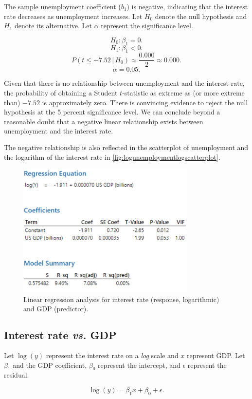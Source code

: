 \documentclass[12pt]{article}
\begin{document}
The sample unemployment coefficient ($b_1$) is negative, indicating that the interest rate decreases as unemployment increases. Let $H_0$ denote the null hypothesis and $H_1$ denote its alternative. Let $\alpha$ represent the significance level.

\[H_0:\beta_1=0.\]
\[H_1:\beta_1<0.\]
\[P(t\leq -7.52\,|\,H_0)\approx\frac{0.000}{2}\approx 0.000.\]
\[\alpha=0.05.\]

Given that there is no relationship between unemployment and the interest rate, the probability of obtaining a Student $t$-statistic as extreme as (or more extreme than) $-7.52$ is approximately zero. There is convincing evidence to reject the null hypothesis at the 5 percent significance level. We can conclude beyond a reasonable doubt that a negative linear relationship exists between unemployment and the interest rate.

The negative relationship is also reflected in the scatterplot of unemployment and the logarithm of the interest rate in \autoref{fig:logunemploymentlogscatterplot}.
\begin{figure}[h]
\begin{center}
\includegraphics[width=3.5in]{images/log-gdp-regression.png}
\end{center}
\caption{Linear regression analysis for interest rate (response, logarithmic) and GDP (predictor). \label{fig:loggdpregression}}
\end{figure}
\subsection{Interest rate \textit{vs.} GDP}
Let $\log(y)$ represent the interest rate on a \textit{log} scale and $x$ represent GDP. Let $\beta_1$ and the GDP coefficient, $\beta_0$ represent the intercept, and $\epsilon$ represent the residual.

\[\log(y)=\beta_1x+\beta_0+\epsilon.\]
\end{document}
